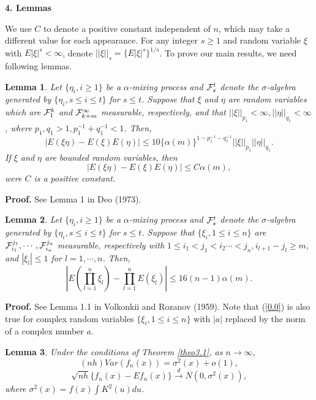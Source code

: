 \documentclass[12pt]{article}
\newtheorem{lemm}{\sc Lemma}
\newcommand{\tod}{\stackrel{d}{\longrightarrow}}
\def\be{\begin{equation}}
\def\ee{\end{equation}}
\begin{document}
\bigskip
\setcounter{section}{4}
\setcounter{equation}{0}
 \noindent
{\bf 4. Lemmas}
\bigskip

We use $C$ to denote a positive constant independent of $n$, which
may take a different value for each appearance.
For any integer $s\geq 1$ and random variable $\xi$ with  $E|\xi|^s<\infty$, denote $||\xi||_s=\{E|\xi|^s\}^{1/s}$.   To prove our main results,
we need following lemmas.

\begin{lemm}\label{lemm4.01}
Let $\{\eta_i, i\geq 1\}$ be a $\alpha$-mixing process and
${\cal{F}}^t_s$ denote the $\sigma$-algebra generated by $\{\eta_i,
s\leq i\leq t\}$ for $s\leq t$. Suppose that $\xi$ and $\eta$ are
random variables which are ${\cal{F}}^k_1$ and ${\cal{F}}^{\infty}_{k+m}$ measurable, respectively, and
that $||\xi||_{p_1}<\infty, ||\eta||_{q_1}< \infty$, where $p_1, q_1>1, p_1^{-1}+q_1^{-1}<1$. Then,
\[
|E(\xi\eta)-E(\xi)E(\eta)|\leq 10\{\alpha(m)\}^{1-p_1^{-1}-q_1^{-1}}||\xi||_{p_1}||\eta||_{q_1}.
\]
If $\xi$ and $\eta$ are bounded
random variables, then
\[
|E(\xi\eta)-E(\xi)E(\eta)|\leq C\alpha(m),
\]
were $C$ is a positive constant.
\end{lemm}

{ \bf Proof. } See Lemma 1 in Deo (1973).


\begin{lemm}\label{lemm4.02}
Let $\{\eta_i, i\geq 1\}$ be a $\alpha$-mixing process and
${\cal{F}}^t_s$ denote the $\sigma$-algebra generated by $\{\eta_i,
s\leq i\leq t\}$ for $s\leq t$. Suppose that  $\{\xi_i, 1\leq i\leq n\}$  are  ${\cal{F}}^{j_1}_{i_1}, \cdots,
{\cal{F}}^{j_n}_{i_n}$ measurable, respectively with $1\leq i_1<j_1<i_2\cdots<j_n, i_{l+1}-j_l\geq m$, and $|\xi_l|\leq 1$ for
$l=1, \cdots, n$. Then,
\be
|E(\prod^n_{l=1}\xi_l)-\prod^n_{l=1}E(\xi_l)|\leq 16(n-1)\alpha(m). \label{0.0}
\ee
\end{lemm}

{ \bf Proof. } See Lemma 1.1 in Volkonkii and Rozanov (1959).  Note that (\ref{0.0}) is also true for complex random variables
$\{\xi_i, 1\leq i\leq n\}$ with $|a|$ replaced by the norm of a complex number $a$.


\smallskip

\begin{lemm}\label{lemm4.04}
Under the conditions of Theorem \ref{theo3.1}, as $n\to \infty$,
\be
(nh)Var(f_n(x))=\sigma^2(x)+o(1), \label{lem06.04.1}
\ee
\be
\sqrt{nh}\{f_n(x)-Ef_n(x)\}\tod N(0, \sigma^2(x)) \label{lem06.04.2},
\ee
where $\sigma^2(x)=f(x)\int K^2(u)du$.
\end{lemm}
\end{document}
